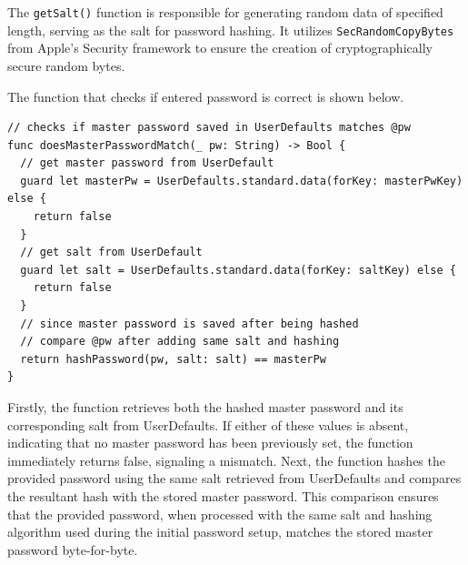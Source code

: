 \documentclass[10pt, titlepage]{article}
\begin{document}
The \texttt{getSalt()} function is responsible for generating random data of specified length, serving as the salt for password hashing. It utilizes \texttt{SecRandomCopyBytes} from Apple's Security framework to ensure the creation of cryptographically secure random bytes.

The function that checks if entered password is correct is shown below.
\begin{center}
\begin{minipage}{\linewidth}
\begin{lstlisting}
// checks if master password saved in UserDefaults matches @pw
func doesMasterPasswordMatch(_ pw: String) -> Bool {
  // get master password from UserDefault
  guard let masterPw = UserDefaults.standard.data(forKey: masterPwKey) else {
    return false
  }
  // get salt from UserDefault
  guard let salt = UserDefaults.standard.data(forKey: saltKey) else {
    return false
  }
  // since master password is saved after being hashed
  // compare @pw after adding same salt and hashing
  return hashPassword(pw, salt: salt) == masterPw
}
\end{lstlisting}
\end{minipage}
\end{center}
Firstly, the function retrieves both the hashed master password and its corresponding salt from UserDefaults. If either of these values is absent, indicating that no master password has been previously set, the function immediately returns false, signaling a mismatch.
Next, the function hashes the provided password using the same salt retrieved from UserDefaults and compares the resultant hash with the stored master password. This comparison ensures that the provided password, when processed with the same salt and hashing algorithm used during the initial password setup, matches the stored master password byte-for-byte.
\end{document}
